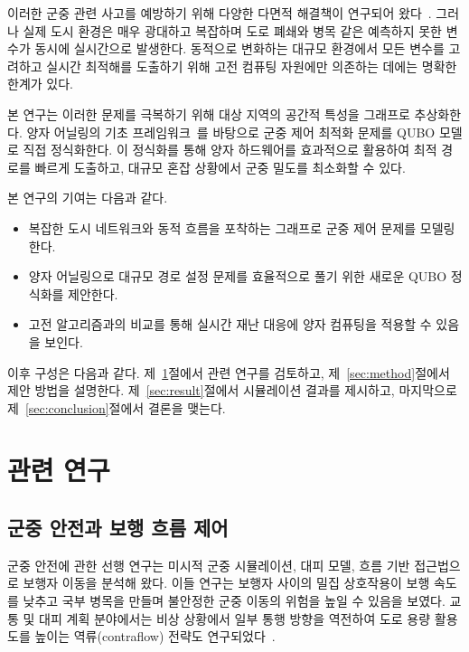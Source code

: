 \documentclass[twocolumn,a4paper]{article}
\begin{document}
이러한 군중 관련 사고를 예방하기 위해 다양한 다면적 해결책이 연구되어 왔다~\cite{Nishinari2024}. 그러나 실제 도시 환경은 매우 광대하고 복잡하며 도로 폐쇄와 병목 같은 예측하지 못한 변수가 동시에 실시간으로 발생한다. 동적으로 변화하는 대규모 환경에서 모든 변수를 고려하고 실시간 최적해를 도출하기 위해 고전 컴퓨팅 자원에만 의존하는 데에는 명확한 한계가 있다.

본 연구는 이러한 문제를 극복하기 위해 대상 지역의 공간적 특성을 그래프로 추상화한다. 양자 어닐링의 기초 프레임워크~\cite{Kadowaki1998}를 바탕으로 군중 제어 최적화 문제를 QUBO 모델로 직접 정식화한다. 이 정식화를 통해 양자 하드웨어를 효과적으로 활용하여 최적 경로를 빠르게 도출하고, 대규모 혼잡 상황에서 군중 밀도를 최소화할 수 있다.

본 연구의 기여는 다음과 같다.
\begin{itemize}
    \setlength{\itemsep}{0pt}
    \setlength{\parsep}{0pt}
    \setlength{\parskip}{0pt}
    \item[(1)] 복잡한 도시 네트워크와 동적 흐름을 포착하는 그래프로 군중 제어 문제를 모델링한다.
    \item[(2)] 양자 어닐링으로 대규모 경로 설정 문제를 효율적으로 풀기 위한 새로운 QUBO 정식화를 제안한다.
    \item[(3)] 고전 알고리즘과의 비교를 통해 실시간 재난 대응에 양자 컴퓨팅을 적용할 수 있음을 보인다.
\end{itemize}

이후 구성은 다음과 같다. 제~\ref{sec:related}절에서 관련 연구를 검토하고, 제~\ref{sec:method}절에서 제안 방법을 설명한다. 제~\ref{sec:result}절에서 시뮬레이션 결과를 제시하고, 마지막으로 제~\ref{sec:conclusion}절에서 결론을 맺는다.

\section{관련 연구} \label{sec:related}

\subsection{군중 안전과 보행 흐름 제어} \label{subsec:related_crowd}

군중 안전에 관한 선행 연구는 미시적 군중 시뮬레이션, 대피 모델, 흐름 기반 접근법으로 보행자 이동을 분석해 왔다. 이들 연구는 보행자 사이의 밀집 상호작용이 보행 속도를 낮추고 국부 병목을 만들며 불안정한 군중 이동의 위험을 높일 수 있음을 보였다. 교통 및 대피 계획 분야에서는 비상 상황에서 일부 통행 방향을 역전하여 도로 용량 활용도를 높이는 역류(contraflow) 전략도 연구되었다~\cite{kim2008contraflow, aksu2014mathematical}.
\end{document}
